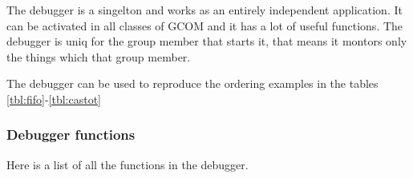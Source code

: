 \documentclass[titlepage, twocolumn, a4paper, 10pt]{article}
\begin{document}

The debugger is a singelton and works as an entirely independent
application. It can be activated in all classes of GCOM and it has a
lot of useful functions. The debugger is uniq for the group member
that starts it, that means it montors only the things which that group
member.

The debugger can be used to reproduce the ordering examples in the tables
\ref{tbl:fifo}-\ref{tbl:castot}

\subsubsection{Debugger functions}\label{sec:debuggerfunctions}
Here is a list of all the functions in the debugger.
\end{document}
